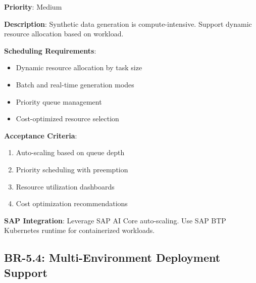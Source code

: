 \begin{tcolorbox}[colback=purple!5,colframe=purple!70,title=BR-5.3: Compute Resource Management]
\textbf{Priority}: Medium

\textbf{Description}: Synthetic data generation is compute-intensive. Support
dynamic resource allocation based on workload.

\textbf{Scheduling Requirements}:
\begin{itemize}
  \item Dynamic resource allocation by task size
  \item Batch and real-time generation modes
  \item Priority queue management
  \item Cost-optimized resource selection
\end{itemize}

\textbf{Acceptance Criteria}:
\begin{enumerate}
  \item Auto-scaling based on queue depth
  \item Priority scheduling with preemption
  \item Resource utilization dashboards
  \item Cost optimization recommendations
\end{enumerate}

\textbf{SAP Integration}: Leverage SAP AI Core auto-scaling. Use SAP BTP
Kubernetes runtime for containerized workloads.
\end{tcolorbox}

\subsection{BR-5.4: Multi-Environment Deployment Support}

